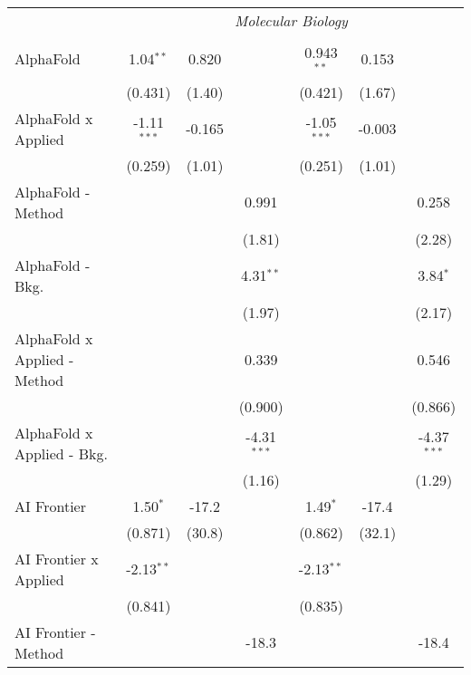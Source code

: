 \begin{tabular}{lcccccc}
 & \multicolumn{6}{c}{\textit{Molecular Biology}} \\ \\
   AlphaFold                    & 1.04$^{**}$   & 0.820   &               & 0.943$^{**}$  & 0.153  &   \\   
                                & (0.431)       & (1.40)  &               & (0.421)       & (1.67) &   \\   
   AlphaFold x Applied          & -1.11$^{***}$ & -0.165  &               & -1.05$^{***}$ & -0.003 &   \\   
                                & (0.259)       & (1.01)  &               & (0.251)       & (1.01) &   \\   
   AlphaFold - Method           &               &         & 0.991         &               &        & 0.258\\   
                                &               &         & (1.81)        &               &        & (2.28)\\   
   AlphaFold - Bkg.             &               &         & 4.31$^{**}$   &               &        & 3.84$^{*}$\\   
                                &               &         & (1.97)        &               &        & (2.17)\\   
   AlphaFold x Applied - Method &               &         & 0.339         &               &        & 0.546\\   
                                &               &         & (0.900)       &               &        & (0.866)\\   
   AlphaFold x Applied - Bkg.   &               &         & -4.31$^{***}$ &               &        & -4.37$^{***}$\\   
                                &               &         & (1.16)        &               &        & (1.29)\\   
   AI Frontier                  & 1.50$^{*}$    & -17.2   &               & 1.49$^{*}$    & -17.4  &   \\   
                                & (0.871)       & (30.8)  &               & (0.862)       & (32.1) &   \\   
   AI Frontier x Applied        & -2.13$^{**}$  &         &               & -2.13$^{**}$  &        &   \\   
                                & (0.841)       &         &               & (0.835)       &        &   \\   
   AI Frontier - Method         &               &         & -18.3         &               &        & -18.4\\   

\end{tabular}
